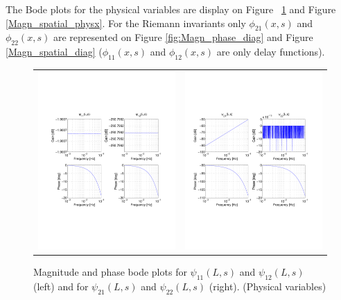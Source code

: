 \documentclass[preprint]{elsarticle}
\begin{document}
The Bode plots for the physical variables are display on Figure ~\ref{fig:Magn_phase_physx} and Figure \ref{Magn_spatial_physx}. For the Riemann invariants only $\phi_{21}(x,s)$ and $\phi_{22}(x,s)$ are represented on Figure \ref{fig:Magn_phase_diag} and Figure \ref{Magn_spatial_diag} ($\phi_{11}(x,s)$ and $\phi_{12}(x,s)$ are only delay functions).

\begin{figure}
\begin{centering}
\begin{tabular}{cc}
\includegraphics[trim = 0mm 60mm 0mm 60mm, width=8cm]{IOv_-3to-1}
& 
\includegraphics[trim = 0mm 60mm 0mm 60mm, width=8cm]{IOq_-3to-1}
\tabularnewline
\end{tabular}
\caption{
Magnitude and phase bode plots for $\psi_{11}(L,s)$ and $\psi_{12}(L,s)$ (left) and for $\psi_{21}(L,s)$ and $\psi_{22}(L,s)$ (right). (Physical variables)
\label{fig:Magn_phase_physx}
}
\par\end{centering}
\end{figure}
\end{document}
